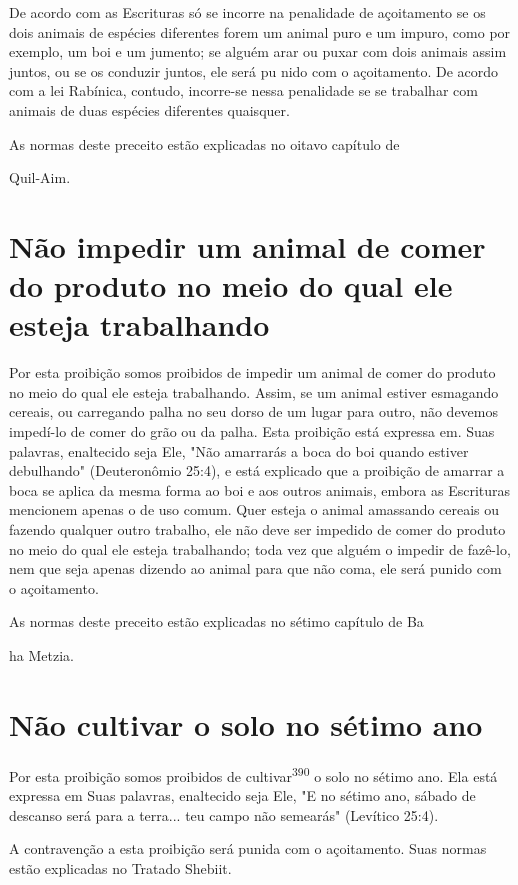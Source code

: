 De acordo com as Escrituras só se incorre na penalidade de açoi­tamento
se os dois animais de espécies diferentes forem um animal puro e um
impuro, como por exemplo, um boi e um jumento; se alguém arar ou puxar
com dois animais assim juntos, ou se os conduzir juntos, ele será pu
nido com o açoitamento. De acordo com a lei Rabínica, contudo,
incorre-se nessa penalidade se se trabalhar com animais de duas espécies
diferentes quaisquer.


As normas deste preceito estão explicadas no oitavo capítulo de


Quil-Aim.

\section{Não impedir um animal de comer do produto no meio do qual ele esteja trabalhando}

Por esta proibição somos proibidos de impedir um animal de comer do
produto no meio do qual ele esteja trabalhando. Assim, se um animal
esti­ver esmagando cereais, ou carregando palha no seu dorso de um lugar
para ou­tro, não devemos impedí-lo de comer do grão ou da palha. Esta
proibição está expressa em. Suas palavras, enaltecido seja Ele, "Não
amarrarás a boca do boi quando estiver debulhando" (Deuteronômio 25:4),
e está explicado que a proi­bição de amarrar a boca se aplica da mesma
forma ao boi e aos outros animais, embora as Escrituras mencionem apenas
o de uso comum. Quer esteja o ani­mal amassando cereais ou fazendo
qualquer outro trabalho, ele não deve ser impedido de comer do produto
no meio do qual ele esteja trabalhando; toda vez que alguém o impedir de
fazê-lo, nem que seja apenas dizendo ao animal para que não coma, ele
será punido com o açoitamento.


As normas deste preceito estão explicadas no sétimo capítulo de Ba


ha Metzia.

\section{Não cultivar o solo no sétimo ano}

Por esta proibição somos proibidos de cultivar\textsuperscript{390} o
solo no sétimo ano. Ela está expressa em Suas palavras, enaltecido seja
Ele, "E no sétimo ano, sábado de descanso será para a terra... teu campo
não semearás" (Levítico 25:4).

A contravenção a esta proibição será punida com o açoitamento. Suas
normas estão explicadas no Tratado Shebiit.


